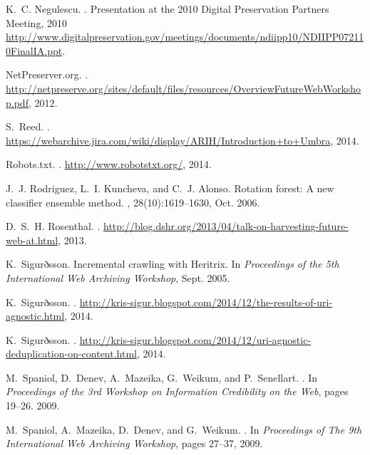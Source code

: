 \documentclass{ipres_proc_article-sp}
\begin{document}
\begin{thebibliography}{10}
K.~C. Negulescu.
.
\newblock Presentation at the 2010 Digital Preservation Partners Meeting, 2010
  \url{http://www.digitalpreservation.gov/meetings/documents/ndiipp10/NDIIPP072110FinalIA.ppt}.

{NetPreserver.org}.
.
\newblock
  \url{http://netpreserve.org/sites/default/files/resources/OverviewFutureWebWorkshop.pdf},
  2012.

S.~Reed.
.
\newblock
  \url{https://webarchive.jira.com/wiki/display/ARIH/Introduction+to+Umbra},
  2014.

{Robots.txt}.
.
\newblock \url{http://www.robotstxt.org/}, 2014.

J.~J. Rodriguez, L.~I. Kuncheva, and C.~J. Alonso.
\newblock Rotation forest: A new classifier ensemble method.
,
  28(10):1619--1630, Oct. 2006.

D.~S.~H. Rosenthal.
.
\newblock
  \url{http://blog.dshr.org/2013/04/talk-on-harvesting-future-web-at.html},
  2013.

K.~Sigurðsson.
\newblock Incremental crawling with {Heritrix}.
\newblock In {\em Proceedings of the 5th International Web Archiving Workshop},
  Sept. 2005.

K.~Sigurðsson.
.
\newblock
  \url{http://kris-sigur.blogspot.com/2014/12/the-results-of-uri-agnostic.html},
  2014.

K.~Sigurðsson.
.
\newblock
  \url{http://kris-sigur.blogspot.com/2014/12/uri-agnostic-deduplication-on-content.html},
  2014.

M.~Spaniol, D.~Denev, A.~Mazeika, G.~Weikum, and P.~Senellart.
.
\newblock In {\em {Proceedings of the 3rd Workshop on Information Credibility
  on the Web}}, pages 19--26. 2009.

M.~Spaniol, A.~Mazeika, D.~Denev, and G.~Weikum.
.
\newblock In {\em {Proceedings of The 9th International Web Archiving
  Workshop}}, pages 27--37, 2009.


\end{thebibliography}
\end{document}
